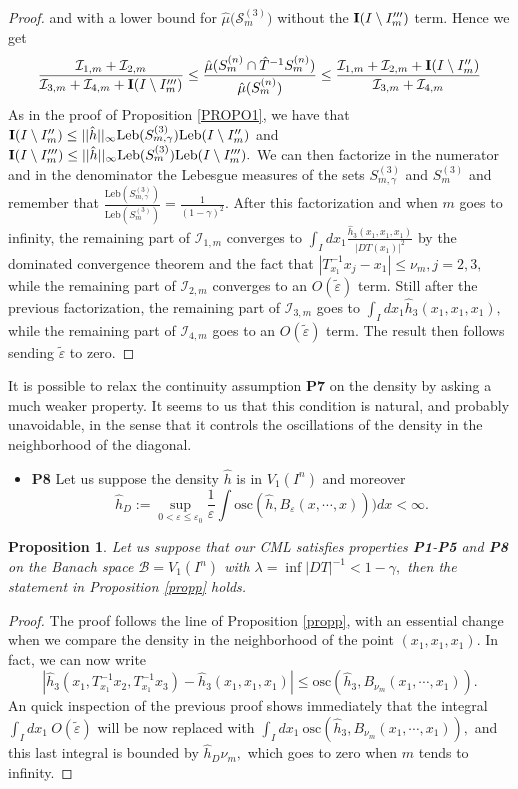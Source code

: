\documentclass[12pt,reqno,a4paper]{amsart}
\newtheorem{prop}[thm]{Proposition}
\let\epsilon\varepsilon
\let\tilde\widetilde
\def\Le{\text{Leb}}
\def\eps{\varepsilon}
\def\eps {\varepsilon}
\begin{document}
\begin{proof}
and with a lower bound for $\hat{\mu}\big(\mathcal{S}^{(3)}_{m})$ without the ${\bf I}(I\setminus I'''_m)$ term.
Hence we get
$$
\frac{\mathcal{I}_{1,m}+\mathcal{I}_{2,m}}{\mathcal{I}_{3,m}+\mathcal{I}_{4,m}+{\bf I}(I\setminus I'''_m)}\le \frac{\hat{\mu}(S^{(n)}_m\cap \hat{T}^{-1} S^{(n)}_m)}{\hat{\mu}(S^{(n)}_m)}\le\frac{\mathcal{I}_{1,m}+\mathcal{I}_{2,m}+{\bf I}(I\setminus I''_m)}{\mathcal{I}_{3,m}+\mathcal{I}_{4,m}}
$$
As in the proof of Proposition \ref{PROPO1}, we have that ${\bf I}(I\setminus I''_m)\le ||\hat{h}||_{\infty}\Le (S^{(3)}_{m,\gamma}) \Le(I\setminus I''_m)$ and ${\bf I}(I\setminus I'''_m)\le ||\hat{h}||_{\infty}\Le (S^{(3)}_{m}) \Le(I\setminus I'''_m).$
We can then factorize in the numerator and in the denominator the Lebesgue measures of
 the sets $S^{(3)}_{m,\gamma}$ and $S^{(3)}_{m}$ and remember that $\frac{\Le (S^{(3)}_{m,\gamma})}{\Le(S^{(3)}_{m})}=\frac{1}{(1-\gamma)^{2}}.$ After this factorization and when $m$ goes to infinity, the remaining part of  $\mathcal{I}_{1,m}$ converges to  $\int_Idx_1\frac{\hat{h}_3(x_1,x_1,x_1)}{|DT(x_1)|^2}$ by the dominated convergence theorem and the fact that  $|T^{-1}_{x_1}x_j-x_1|\le \nu_m, j=2,3,$  while the remaining part of $\mathcal{I}_{2,m}$ converges to an $O(\tilde{\eps})$ term. Still after the previous factorization,  the remaining part of   $\mathcal{I}_{3,m}$ goes to $\int_I dx_1 \hat{h}_3(x_1,x_1,x_1),$ while the remaining part of $\mathcal{I}_{4,m}$ goes to an $O(\tilde{\eps})$ term. The result then follows sending $\tilde{\eps}$ to zero.
\end{proof}
It is possible to relax the continuity assumption {\bf P7} on the density by asking a much weaker property. It seems to us that this condition is natural, and probably unavoidable,  in the sense that it controls the oscillations  of the density in the neighborhood  of the diagonal.
\begin{itemize}
\item {\bf P8} Let us suppose the density $\hat{h}$ is in $V_{1}(I^n)$ and moreover
    $$
    \hat{h}_D:=\sup_{0<\eps\le \eps_0}\frac{1}{\eps}\int \text{osc}(\hat{h}, B_{\eps}(x,\cdots,x))) dx<\infty.
    $$
\end{itemize}
\begin{prop}\label{proppp}
Let us suppose that our CML satisfies properties {\bf P1}-{\bf P5} and {\bf P8} on the Banach space $\mathcal{B}=V_{1}(I^n)$ with $\lambda=\inf|DT|^{-1}<1-\gamma,$  then the statement in Proposition \ref{propp} holds.
\end{prop}
\begin{proof}
The proof follows the line of Proposition \ref{propp}, with an essential change when we compare the density in the neighborhood of the point $(x_1,x_1,x_1)$. In fact, we can now write
$$
|\hat{h}_3(x_1, T_{x_1}^{-1}x_2, T_{x_1}^{-1}x_3)-\hat{h}_3(x_1,x_1,x_1)|\le \text{osc}(\hat{h}_3, B_{\nu_m}(x_1,\cdots,x_1)).$$ An quick inspection of the previous proof shows immediately that the integral
$\int_I dx_1\  O(\tilde{\epsilon})$ will be now replaced with $\int_I dx_1 \ \text{osc}(\hat{h}_3, B_{\nu_m}(x_1,\cdots,x_1)),$ and this last integral is bounded by $\hat{h}_D \nu_m,$ which goes to zero when $m$ tends to infinity.
\end{proof}
\end{document}
